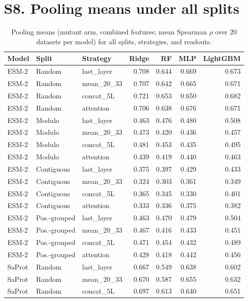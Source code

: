 \documentclass[11pt,a4paper]{article}
\begin{document}
\section*{S8. Pooling means under all splits}

\begin{table}[H]\centering\small
\caption{Pooling means (mutant arm, combined features; mean Spearman $\rho$ over 20 datasets per model) for all splits, strategies, and readouts.}
\label{tab:S8poolmeans}
\begin{tabular}{lllrrrr}
\toprule
Model & Split & Strategy & Ridge & RF & MLP & LightGBM \\
\midrule
ESM-2 & Random & last\_layer & 0.708 & 0.644 & 0.669 & 0.673 \\
ESM-2 & Random & mean\_20\_33 & 0.707 & 0.642 & 0.665 & 0.671 \\
ESM-2 & Random & concat\_5L & 0.721 & 0.653 & 0.650 & 0.682 \\
ESM-2 & Random & attention & 0.706 & 0.638 & 0.676 & 0.671 \\
ESM-2 & Modulo & last\_layer & 0.463 & 0.476 & 0.480 & 0.508 \\
ESM-2 & Modulo & mean\_20\_33 & 0.473 & 0.420 & 0.436 & 0.457 \\
ESM-2 & Modulo & concat\_5L & 0.481 & 0.453 & 0.435 & 0.495 \\
ESM-2 & Modulo & attention & 0.439 & 0.419 & 0.440 & 0.463 \\
ESM-2 & Contiguous & last\_layer & 0.375 & 0.397 & 0.429 & 0.433 \\
ESM-2 & Contiguous & mean\_20\_33 & 0.324 & 0.303 & 0.361 & 0.349 \\
ESM-2 & Contiguous & concat\_5L & 0.365 & 0.345 & 0.330 & 0.401 \\
ESM-2 & Contiguous & attention & 0.333 & 0.336 & 0.375 & 0.382 \\
ESM-2 & Pos.-grouped & last\_layer & 0.463 & 0.470 & 0.479 & 0.504 \\
ESM-2 & Pos.-grouped & mean\_20\_33 & 0.467 & 0.416 & 0.433 & 0.451 \\
ESM-2 & Pos.-grouped & concat\_5L & 0.471 & 0.454 & 0.432 & 0.489 \\
ESM-2 & Pos.-grouped & attention & 0.428 & 0.418 & 0.442 & 0.456 \\
\midrule
SaProt & Random & last\_layer & 0.667 & 0.549 & 0.638 & 0.602 \\
SaProt & Random & mean\_20\_33 & 0.670 & 0.587 & 0.655 & 0.632 \\
SaProt & Random & concat\_5L & 0.697 & 0.613 & 0.640 & 0.651 \\

\end{tabular}
\end{table}
\end{document}
